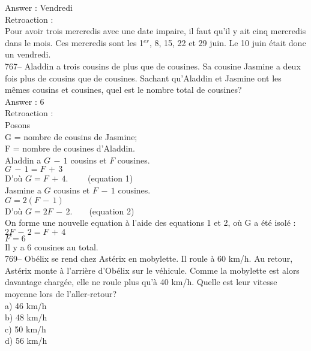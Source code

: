 ﻿\documentclass[letterpaper, 12pt]{article}
\begin{document}
Answer : Vendredi\\

Retroaction : \\
Pour avoir trois mercredis avec une date impaire, il faut qu'il y ait cinq
mercredis dans le mois.  Ces mercredis sont les 1$^{er}$, 8, 15, 22 et 29
juin.  Le 10 juin \'etait donc un vendredi.  \\


767-- Aladdin a trois cousins de plus que de cousines.  Sa cousine Jasmine a
deux fois plus de cousins que de cousines.  Sachant qu'Aladdin et Jasmine
ont les m\^emes cousins et cousines, quel est le nombre total de cousines?\\

Answer : 6 \\

Retroaction : \\
Posons\\
G = nombre de cousins de Jasmine;\\
F = nombre de cousines d'Aladdin.\\

Aladdin a $G\,-\,1$ cousins et $F$ cousines.\\
$G\,-\,1=F\,+\,3$\\
D'o\`u $G=F\,+\,4. \qquad$ (equation 1)\\

Jasmine a $G$ cousins et $F\,-\,1$ cousines.  \\
$G=2\left( F\,-\,1\right)  $\\
D'o\`u $G=2F\,-\,2. \qquad $(equation 2) \\

On forme une nouvelle equation \`a l'aide des equations 1 et 2, o\`u G a
\'et\'e isol\'e :\\
$2F\,-\,2=F\,+\,4$\\
$F=6$\\
Il y a 6 cousines au total.\\



769-- Ob\'elix se rend chez Ast\'erix en mobylette.  Il roule \`a 60 km/h.
Au retour, Ast\'erix monte \`a l'arri\`ere d'Ob\'elix sur le v\'ehicule.
Comme la mobylette est alors davantage charg\'ee, elle ne roule plus qu'\`a
40 km/h.  Quelle est leur vitesse moyenne lors de l'aller-retour?\\
a) 46 km/h\\
b) 48 km/h\\
c) 50 km/h\\
d) 56 km/h\\
\end{document}
